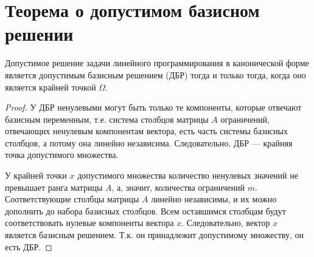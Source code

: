 \documentclass[17pt]{extarticle}
\begin{document}
\section{Теорема о допустимом базисном решении}

\begin{theorem}
    Допустимое решение задачи линейного программирования в канонической форме является допустимым базисным решением (ДБР) тогда и только тогда, когда оно является крайней точкой \( \Omega \).
\end{theorem}

\begin{proof}
    У ДБР ненулевыми могут быть только те компоненты, которые отвечают базисным переменным, т.е. система столбцов матрицы \( A \) ограничений, отвечающих ненулевым компонентам вектора, есть часть системы базисных столбцов, а потому она линейно независима. Следовательно, ДБР — крайняя точка допустимого множества.

    У крайней точки \( x \) допустимого множества количество ненулевых значений не превышает ранга матрицы \( A \), а, значит, количества ограничений \( m \). Соответствующие столбцы матрицы \( A \) линейно независимы, и их можно дополнить до набора базисных столбцов. Всем оставшимся столбцам будут соответствовать нулевые компоненты вектора \( x \). Следовательно, вектор \( x \) является базисным решением. Т.к. он принадлежит допустимому множеству, он есть ДБР.
\end{proof}
\end{document}
